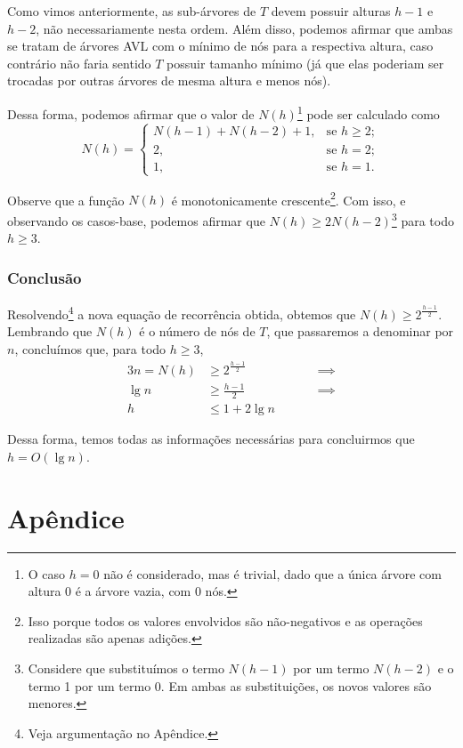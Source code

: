 \documentclass[11pt,twoside]{article}
\theoremstyle{definition}
\begin{document}
Como vimos anteriormente, as sub-árvores de \( T \) devem possuir alturas \( h-1 \) e \( h-2 \), não necessariamente nesta ordem. Além disso, podemos afirmar que ambas se tratam de árvores AVL com o mínimo de nós para a respectiva altura, caso contrário não faria sentido \( T \) possuir tamanho mínimo (já que elas poderiam ser trocadas por outras árvores de mesma altura e menos nós).

Dessa forma, podemos afirmar que o valor de \( N(h) \)\footnote{O caso \( h = 0 \) não é considerado, mas é trivial, dado que a única árvore com altura 0 é a árvore vazia, com 0 nós.} pode ser calculado como \[ N(h) = \begin{cases}
		N(h-1) + N(h-2) + 1, & \text{se } h \geq 2; \\
		2                  , & \text{se } h = 2;    \\
		1                  , & \text{se } h = 1.
	\end{cases} \]

Observe que a função \( N(h) \) é monotonicamente crescente\footnote{Isso porque todos os valores envolvidos são não-negativos e as operações realizadas são apenas adições.}. Com isso, e observando os casos-base, podemos afirmar que \( N(h) \geq 2N(h-2) \)\footnote{Considere que substituímos o termo \( N(h-1) \) por um termo \( N(h-2) \) e o termo 1 por um termo 0. Em ambas as substituições, os novos valores são menores.} para todo \( h \geq 3 \).

\section{Conclusão}

Resolvendo\footnote{Veja argumentação no Apêndice.} a nova equação de recorrência obtida, obtemos que \( N(h) \geq 2^{\frac{h-1}{2}} \). Lembrando que \( N(h) \) é o número de nós de \( T \), que passaremos a denominar por \( n \), concluímos que, para todo \( h \geq 3 \),
\begin{alignat*}{3}
	n = N(h) & \geq 2^{\frac{h-1}{2}} & \quad &  & \implies \\
	\lg n    & \geq \frac{h-1}{2}     & \quad &  & \implies \\
	h        & \leq 1 + 2 \lg n       & \quad &  &
\end{alignat*}

Dessa forma, temos todas as informações necessárias para concluirmos que \( h = O(\lg n) \).

\part*{Apêndice}
\end{document}
